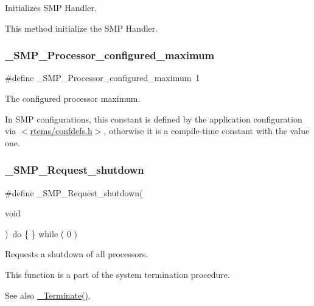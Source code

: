 Initializes S\+MP Handler. 

This method initialize the S\+MP Handler. \mbox{\label{group__RTEMSScoreSMP_gacb6a362fb4304b485d32c789869bc646}} 
\subsubsection{\texorpdfstring{\_SMP\_Processor\_configured\_maximum}{\_SMP\_Processor\_configured\_maximum}}
{\footnotesize\ttfamily \#define \+\_\+\+S\+M\+P\+\_\+\+Processor\+\_\+configured\+\_\+maximum~1}



The configured processor maximum. 

In S\+MP configurations, this constant is defined by the application configuration via $<$\mbox{\hyperlink{confdefs_8h}{rtems/confdefs.\+h}}$>$, otherwise it is a compile-\/time constant with the value one. \mbox{\label{group__RTEMSScoreSMP_ga93fec43bed07a0173284fef946e4c271}} 
\subsubsection{\texorpdfstring{\_SMP\_Request\_shutdown}{\_SMP\_Request\_shutdown}}
{\footnotesize\ttfamily \#define \+\_\+\+S\+M\+P\+\_\+\+Request\+\_\+shutdown(\begin{DoxyParamCaption}\item[{}]{void }\end{DoxyParamCaption})~do \{ \} while ( 0 )}



Requests a shutdown of all processors. 

This function is a part of the system termination procedure.

\begin{DoxySeeAlso}{See also}
\mbox{\hyperlink{group__RTEMSScoreIntErr_ga5102f2f0c5939020aa3b11d67afa84eb}{\+\_\+\+Terminate()}}. 
\end{DoxySeeAlso}
\mbox{\label{group__RTEMSScoreSMP_gac0625ecf5b4d6c951b76f2a5fe6612d1}} 
